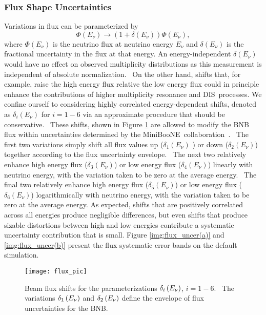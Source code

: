 \documentclass{article}
\begin{document}
\subsubsection{Flux Shape Uncertainties}

Variations in flux can be parameterized by%
\begin{equation}
\Phi \left( E_{\nu}\right) \rightarrow \left( 1+\delta \left( E_{\nu}\right)
\right) \Phi \left( E_{\nu}\right) ,
\end{equation}%
where $\Phi \left( E_{\nu}\right) $ is the neutrino flux at neutrino energy $%
E_{\nu}$ and $\delta \left( E_{\nu}\right) $ is the fractional uncertainty in
the flux at that energy. An energy-independent $\delta \left( E_{\nu}\right) $
would have no effect on observed multiplicity distributions as this
measurement is independent of absolute normalization. \ On the other hand,
shifts that, for example, raise the high energy flux relative the low energy
flux could in principle enhance the contributions of higher multiplicity
resonance and DIS\ processes.  We confine ourself to considering highly
correlated energy-dependent shifts, denoted as $\delta _{i}\left(
E_{\nu}\right) $ for $i=1-6$ via an approximate procedure that should be
conservative. \ These shifts, shown in Figure \ref{img:flux shifts} are
allowed to modify the BNB flux within uncertainties determined by the
MiniBooNE\ collaboration~\cite{BNB reference}. \ The first two 
variations simply shift all flux values up ($\delta _{1}\left( E_{\nu}\right) $%
)  or down ($\delta _{2}\left( E_{\nu}\right) $) together according to the
flux uncertainty envelope. \ The next two relatively enhance high energy
flux ($\delta _{3}\left( E_{\nu}\right) $) or  low energy flux ($\delta
_{4}\left( E_{\nu}\right) $) linearly with neutrino energy, with the variation
taken to be zero at the average energy. \ The final two relatively enhance
high energy flux ($\delta _{5}\left( E_{\nu}\right) $) or low energy flux ($%
\delta _{6}\left( E_{\nu}\right) $) logarithmically with neutrino energy,
with the variation taken to be zero at the average energy. As expected,
shifts that are positively correlated across all energies produce negligible
differences, but even shifts that produce sizable distortions between high
and low energies contribute a systematic uncertainty contribution that is
small. Figure \ref{img:flux_uncer(a)} and \ref{img:flux_uncer(b)} present the flux systematic error bands on the default simulation.

\begin{figure}[tbp]
\centering
\texttt{[image: flux\_pic]} %
\caption{Beam flux shifts for the parameterizations $\protect\delta %
_{i}\left( E_{\nu}\right) $, $i=1-6$. \ The variations $\protect\delta %
_{1}\left( E_{\nu}\right) $ and $\protect\delta _{2}\left( E_{\nu}\right) $
define the envelope of flux uncertainties for the BNB. }
\label{img:flux shifts}
\end{figure}
\end{document}
